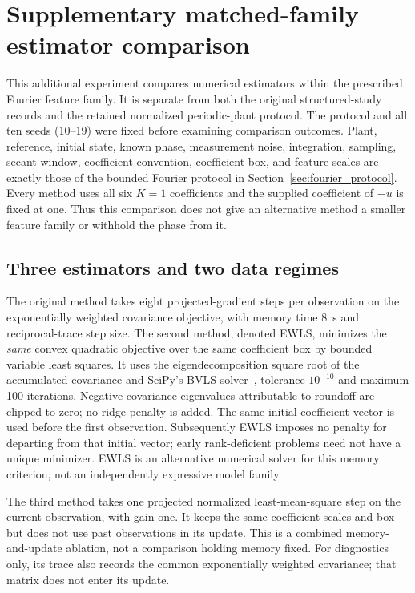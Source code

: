 \section{Supplementary matched-family estimator comparison}
\label{sec:estimator_comparison}
This additional experiment compares numerical estimators within the prescribed
Fourier feature family. It is separate from both the original structured-study
records and the retained normalized periodic-plant protocol.
The protocol and all ten seeds (10--19) were fixed before examining comparison
outcomes. Plant, reference, initial state, known phase, measurement noise,
integration, sampling, secant window, coefficient convention, coefficient box,
and feature scales are exactly those of the bounded Fourier protocol in
Section~\ref{sec:fourier_protocol}. Every
method uses all six $K=1$ coefficients and the supplied coefficient of $-u$ is
fixed at one. Thus this comparison does not give an alternative method a smaller
feature family or withhold the phase from it.

\subsection{Three estimators and two data regimes}
The original method takes eight projected-gradient steps per observation on
the exponentially weighted covariance objective, with memory time $8$~s and
reciprocal-trace step size. The second method, denoted EWLS, minimizes the
\emph{same} convex quadratic objective over the same coefficient box by bounded
variable least squares. It uses the eigendecomposition square root of the
accumulated covariance and SciPy's BVLS solver~\cite{SciPyBVLS}, tolerance $10^{-10}$ and maximum
100 iterations. Negative covariance eigenvalues attributable to roundoff are
clipped to zero; no ridge penalty is added. The same initial coefficient vector
is used before the first observation. Subsequently EWLS imposes no penalty for
departing from that initial vector; early rank-deficient problems need not have
a unique minimizer. EWLS is an alternative numerical solver for this memory
criterion, not an independently expressive model family.

The third method takes one projected normalized least-mean-square step on the
current observation, with gain one. It keeps the same coefficient scales and
box but does not use past observations in its update. This is a combined
memory-and-update ablation, not a comparison holding memory fixed. For
diagnostics only, its trace also records the common exponentially weighted
covariance; that matrix does not enter its update.

